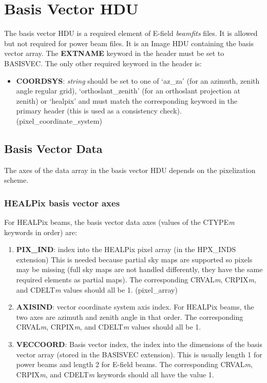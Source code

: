 \documentclass[11pt, oneside]{article}   	%
\begin{document}
\section{Basis Vector HDU}
The basis vector HDU is a required element of E-field \textit{beamfits} files. It is allowed but not required for power beam files. It is an Image HDU containing the basis vector array.
The \textbf{EXTNAME} keyword in the header must be set to BASISVEC. The only other required keyword in the header is:

\begin{itemize}
\item{\textbf{COORDSYS}: \textit{string} should be set to one of `az\_za' (for an azimuth, zenith angle regular grid), `orthoslant\_zenith' (for an orthoslant projection at zenith) or `healpix'  and must match the corresponding keyword in the primary header (this is used as a consistency check). (pixel\_coordinate\_system)}
\end{itemize}

\subsection{Basis Vector Data}
The axes of the data array in the basis vector HDU depends on the pixelization scheme.

\subsubsection{HEALPix basis vector axes}
For HEALPix beams, the basis vector data axes (values of the CTYPE\textit{m} keywords in order) are: 

\begin{enumerate}
\item{\textbf{PIX\_IND}: index into the HEALPix pixel array (in the HPX\_INDS extension) This is needed because partial sky maps are supported so pixels may be missing (full sky maps are not handled differently, they have the same required elements as partial maps). The corresponding CRVAL\textit{m}, CRPIX\textit{m}, and CDELT\textit{m} values should all be 1. (pixel\_array)}
\item{\textbf{AXISIND}: vector coordinate system axis index. For HEALPix beams, the two axes are azimuth and zenith angle in that order.  The corresponding CRVAL\textit{m}, CRPIX\textit{m}, and CDELT\textit{m} values should all be 1. }
\item{\textbf{VECCOORD}: Basis vector index, the index into the dimensions of the basis vector array (stored in the BASISVEC extension). This is usually length 1 for power beams and length 2 for E-field beams. The corresponding CRVAL\textit{m}, CRPIX\textit{m}, and CDELT\textit{m} keywords should all have the value 1.}
\end{enumerate}
\end{document}
